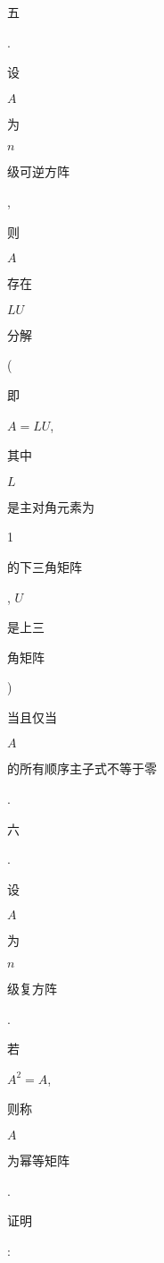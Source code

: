 \documentclass[10pt]{article}
\begin{document}
\begin{CJK}{UTF8}{mj}五\end{CJK}. \begin{CJK}{UTF8}{mj}设\end{CJK} $A$ \begin{CJK}{UTF8}{mj}为\end{CJK} $n$ \begin{CJK}{UTF8}{mj}级可逆方阵\end{CJK}, \begin{CJK}{UTF8}{mj}则\end{CJK} $A$ \begin{CJK}{UTF8}{mj}存在\end{CJK} $L U$ \begin{CJK}{UTF8}{mj}分解\end{CJK} (\begin{CJK}{UTF8}{mj}即\end{CJK} $A=L U$, \begin{CJK}{UTF8}{mj}其中\end{CJK} $L$ \begin{CJK}{UTF8}{mj}是主对角元素为\end{CJK} 1 \begin{CJK}{UTF8}{mj}的下三角矩阵\end{CJK}, $U$ \begin{CJK}{UTF8}{mj}是上三\end{CJK} \begin{CJK}{UTF8}{mj}角矩阵\end{CJK}) \begin{CJK}{UTF8}{mj}当且仅当\end{CJK} $A$ \begin{CJK}{UTF8}{mj}的所有顺序主子式不等于零\end{CJK}.

\begin{CJK}{UTF8}{mj}六\end{CJK}. \begin{CJK}{UTF8}{mj}设\end{CJK} $A$ \begin{CJK}{UTF8}{mj}为\end{CJK} $n$ \begin{CJK}{UTF8}{mj}级复方阵\end{CJK}. \begin{CJK}{UTF8}{mj}若\end{CJK} $A^{2}=A$, \begin{CJK}{UTF8}{mj}则称\end{CJK} $A$ \begin{CJK}{UTF8}{mj}为幂等矩阵\end{CJK}. \begin{CJK}{UTF8}{mj}证明\end{CJK}:
\end{document}
